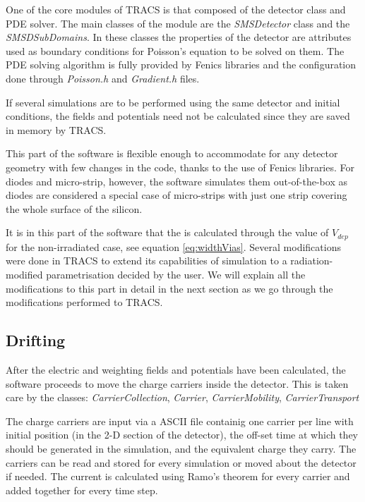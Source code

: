 One of the core modules of TRACS is that composed of the detector class and PDE solver. The main classes of the module are the \textit{SMSDetector} class and the \textit{SMSDSubDomains}. In these classes the properties of the detector are attributes used as boundary conditions for Poisson's equation to be solved on them. The PDE solving algorithm is fully provided by Fenics libraries and the configuration done through \textit{Poisson.h} and \textit{Gradient.h} files.

If several simulations are to be performed using the same detector and initial conditions, the fields and potentials need not be calculated since they are saved in memory by TRACS. 

This part of the software is flexible enough to accommodate for any detector geometry with few changes in the code, thanks to the use of Fenics libraries. For diodes and micro-strip, however, the software simulates them out-of-the-box as diodes are considered a special case of micro-strips with just one strip covering the whole surface of the silicon.

It is in this part of the software that the \neff is calculated through the value of $V_{dep}$ for the non-irradiated case, see equation \ref{eq:widthVias}. Several modifications were done in TRACS to extend its capabilities of simulation to a radiation-modified \neff parametrisation decided by the user. We will explain all the modifications to this part in detail in the next section as we go through the modifications performed to TRACS.


\subsection{Drifting}

After the electric and weighting fields and potentials have been calculated, the software proceeds to move the charge carriers inside the detector. This is taken care by the classes: \textit{CarrierCollection}, \textit{Carrier}, \textit{CarrierMobility}, \textit{CarrierTransport}

The charge carriers are input via a ASCII file containig one carrier per line with initial position (in the 2-D section of the detector), the off-set time at which they should be generated in the simulation, and the equivalent charge they carry. The carriers can be read and stored for every simulation or moved about the detector if needed. The current is calculated using Ramo's theorem for every carrier and added together for every time step.

